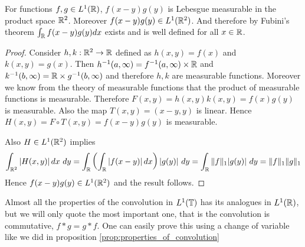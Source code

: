   \begin{proposition}
    For functions $f, g \in L^1(\mathbb R)$, $f(x-y)g(y)$ is Lebesgue measurable in the product space $\mathbb R^2$. Moreover $f(x-y)g(y) \in L^1(\mathbb R^2)$. And therefore by Fubini's theorem $\int_\mathbb R f(x-y)g(y) dx$ exists and is well defined for all $x \in \mathbb R$. 
  \end{proposition}
  \begin{proof}
    Consider $h, k : \mathbb R^2 \to \mathbb R$ defined as $h(x, y) = f(x)$ and $k(x, y) = g(x)$. Then $h^{-1}(a, \infty) = f^{-1}(a, \infty) \times \mathbb R$ and $k^{-1}(b, \infty) = \mathbb R \times g^{-1}(b, \infty)$ and therefore $h, k$ are measurable functions. Moreover we know from the theory of measurable functions that the product of measurable functions is measurable. Therefore $F(x, y) = h(x, y)k(x, y) = f(x)g(y)$ is measurable. Also the map $T(x, y) = (x-y, y)$ is linear. Hence $H(x, y) = F\circ T(x, y) = f(x-y)g(y)$ is measurable. 

    Also $H \in L^1(\mathbb R^2)$ implies $$\int_{\mathbb R^2} \left|H(x, y)\right| dx \ dy  = \int_\mathbb R \left( \int_\mathbb R \left|f(x-y)\right| dx \right)|g(y)| \ dy = \int_\mathbb R \|f\|_1 |g(y)| \ dy = \|f\|_1\|g\|_1$$
   Hence $f(x-y)g(y) \in L^1(\mathbb R^2)$ and the result follows.
    
  \end{proof}

  Almost all the properties of the convolution in $L^1(\mathbb T)$ has its analogues in $L^1(\mathbb R)$, but we will only quote the most important one, that is the convolution is commutative, $f*g = g*f$. One can easily prove this using a change of variable like we did in proposition \ref{prop:properties_of_convolution}

